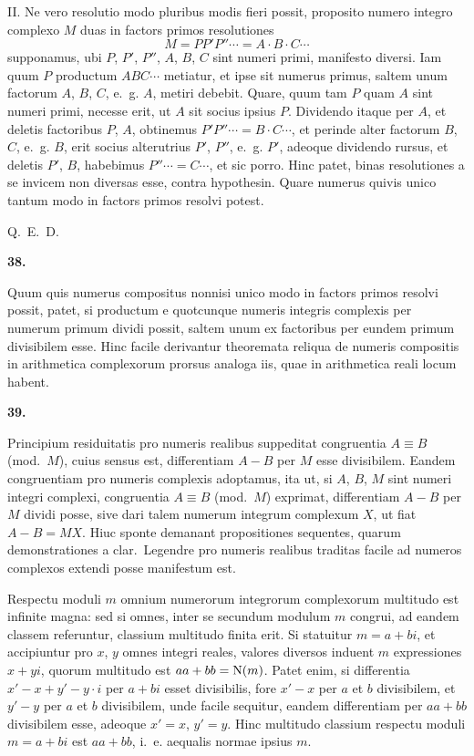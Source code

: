 \documentclass[12pt,a4paper]{article}
\newcommand{\art}[1]{\begin{center}\textbf{#1.}\end{center}}
\newcommand{\norm}[1]{\textup{N}(#1)}
\begin{document}
II. Ne vero resolutio modo pluribus modis fieri possit, proposito numero integro complexo $M$ duas in factors primos resolutiones
\[M=PP'P''\cdots=A\cdot B\cdot C\cdots\]
supponamus, ubi $P$, $P'$, $P''$, $A$, $B$, $C$ sint numeri primi, manifesto diversi. Iam quum $P$ productum $ABC\cdots$ metiatur, et ipse sit numerus primus, saltem unum factorum $A$, $B$, $C$, e.~g. $A$, metiri debebit. Quare, quum tam $P$ quam $A$ sint numeri primi, necesse erit, ut $A$ sit socius ipsius $P$. Dividendo itaque per $A$, et deletis factoribus $P$, $A$, obtinemus $P'P''\cdots=B\cdot C\cdots$, et perinde alter factorum $B$, $C$, e.~g. $B$, erit socius alterutrius $P'$, $P''$, e.~g. $P'$, adeoque dividendo rursus, et deletis $P'$, $B$, habebimus $P''\cdots=C\cdots$, et sic porro. Hinc patet, binas resolutiones a se invicem non diversas esse, contra hypothesin. Quare numerus quivis unico tantum modo in factors primos resolvi potest.

\textsc{Q.~E.~D.}

\art{38}

Quum quis numerus compositus nonnisi unico modo in factors primos resolvi possit, patet, si productum e quotcunque numeris integris complexis per numerum primum dividi possit, saltem unum ex factoribus per eundem primum divisibilem esse. Hinc facile derivantur theoremata reliqua de numeris compositis in arithmetica complexorum prorsus analoga iis, quae in arithmetica reali locum habent.

\art{39}

Principium residuitatis pro numeris realibus suppeditat congruentia $A\equiv B$ (mod.~$M$), cuius sensus est, differentiam $A-B$ per $M$ esse divisibilem. Eandem congruentiam pro numeris complexis adoptamus, ita ut, si $A$, $B$, $M$ sint numeri integri complexi, congruentia $A\equiv B$ (mod.~$M$) exprimat, differentiam $A-B$ per $M$ dividi posse, sive dari talem numerum integrum complexum $X$, ut fiat $A-B=MX$. Hiuc sponte demanant propositiones sequentes, quarum demonstrationes a clar.~Legendre pro numeris realibus traditas facile ad numeros complexos extendi posse manifestum est.

Respectu moduli $m$ omnium numerorum integrorum complexorum multitudo est infinite magna: sed si omnes, inter se secundum modulum $m$ congrui, ad eandem classem referuntur, classium multitudo finita erit. Si statuitur $m=a+bi$, et accipiuntur pro $x$, $y$ omnes integri reales, valores diversos induent $m$ expressiones $x+yi$, quorum multitudo est $aa+bb=\norm{m}$. Patet enim, si differentia $x'-x+y'-y\cdot i$ per $a+bi$ esset divisibilis, fore $x'-x$ per $a$ et $b$ divisibilem, et $y'-y$ per $a$ et $b$ divisibilem, unde facile sequitur, eandem differentiam per $aa+bb$ divisibilem esse, adeoque $x'=x$, $y'=y$. Hinc multitudo classium respectu moduli $m=a+bi$ est $aa+bb$, i.~e. aequalis normae ipsius $m$.
\end{document}
